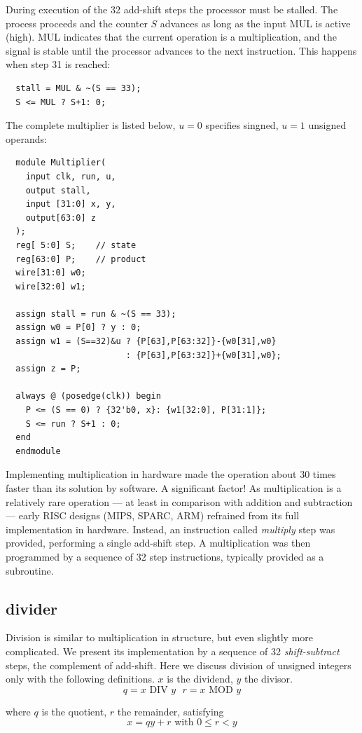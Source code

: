 During execution of the 32 add-shift steps the processor must be stalled. The process proceeds
and the counter $S$ advances as long as the input MUL is active (high). MUL indicates that the
current operation is a multiplication, and the signal is stable until the processor advances to
the next instruction. This happens when step 31 is reached:
\begin{verbatim}
  stall = MUL & ~(S == 33);
  S <= MUL ? S+1: 0;
\end{verbatim}

The complete multiplier is listed below, $u = 0$ specifies singned, $u = 1$ unsigned operands:
\begin{verbatim}
  module Multiplier(
    input clk, run, u,
    output stall,
    input [31:0] x, y,
    output[63:0] z
  );
  reg[ 5:0] S;    // state
  reg[63:0] P;    // product
  wire[31:0] w0;
  wire[32:0] w1;
  
  assign stall = run & ~(S == 33);
  assign w0 = P[0] ? y : 0;
  assign w1 = (S==32)&u ? {P[63],P[63:32]}-{w0[31],w0}
                        : {P[63],P[63:32]}+{w0[31],w0};
  assign z = P;
 
  always @ (posedge(clk)) begin
    P <= (S == 0) ? {32'b0, x}: {w1[32:0], P[31:1]};
    S <= run ? S+1 : 0;
  end
  endmodule
\end{verbatim}

Implementing multiplication in hardware made the operation about 30 times faster than its solution
by software. A significant factor! As multiplication is a relatively rare operation — at least in
comparison with addition and subtraction — early RISC designs (MIPS, SPARC, ARM) refrained from its
full implementation in hardware. Instead, an instruction called \emph{multiply} step was provided,
performing a single add-shift step. A multiplication was then programmed by a sequence of 32 step
instructions, typically provided as a subroutine.

\subsection{divider}
Division is similar to multiplication in structure, but even slightly more complicated. We present
its implementation by a sequence of 32 \emph{shift-subtract} steps, the complement of add-shift.
Here we discuss division of unsigned integers only with the following definitions. $x$ is the
dividend, $y$ the divisor.
\[ q = x\text{ DIV }y\text{  }r = x\text{ MOD }y \]

where $q$ is the quotient, $r$ the remainder, satisfying
\[ x = qy + r\text{ with }0 \le r < y \]

